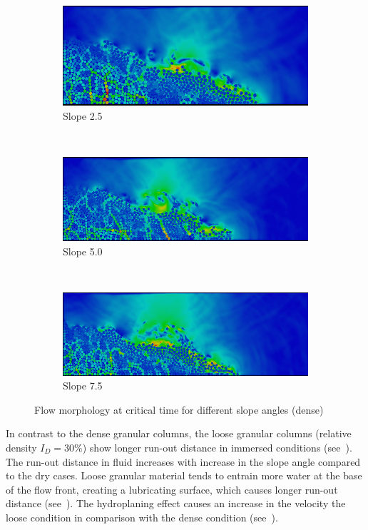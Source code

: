 \begin{figure}
\begin{subfigure}[h]{0.5\columnwidth}
	\centering
    \includegraphics{dense_slope25r09}
    \caption{Slope 2.5}
    \label{fig:ds2.5}
\end{subfigure} \\

\begin{subfigure}[h]{0.5\columnwidth}
	\centering
    \includegraphics{dense_slope5r09}
    \caption{Slope 5.0}
    \label{fig:ds5.0}
\end{subfigure} \\

\begin{subfigure}[h]{0.5\columnwidth}
	\centering
    \includegraphics{dense_slope75r09}
    \caption{Slope 7.5}
    \label{fig:ds7.5}
\end{subfigure} 
\caption{Flow morphology at critical time for different slope angles (dense)}
\label{fig:slope_dense}
\end{figure}

In contrast to the dense granular columns, the loose granular columns (relative density $I_D=30 \%$) show longer run-out distance in immersed conditions (see~). The run-out distance in fluid increases with increase in the slope angle compared to the dry cases. Loose granular material tends to entrain more water at the base of the flow front, creating a lubricating surface, which causes longer run-out distance (see~). The hydroplaning effect causes an increase in the velocity the loose condition in comparison with the dense condition (see~).

